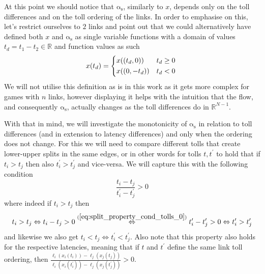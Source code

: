 \documentclass[10pt,a4paper]{book}
\newcommand{\LeftrightarrowArg}[1]{\stackrel{#1}{\Leftrightarrow}}
\newcommand{\as}{\mathrm{\alpha_s}}
\newcommand{\R}{\mathbb{R}}
\theoremstyle{definition}
\theoremstyle{comment}
\begin{document}
At this point we should notice that $\as$, similarly to $x$, depends only on the toll differences and on the toll ordering of the links.
In order to emphasise on this, let's restrict ourselves to $2$ links and point out that we could alternatively have defined both $x$ and $\as$ as single variable functions with a domain of values $t_d = t_1 - t_2 \in \R$ and function values as such
\[
	x(t_d) =
	\begin{cases*}
		x((t_d, 0)) & $t_d \ge 0$ \\
		x((0, -t_d)) & $t_d < 0$ \\
	\end{cases*}
\]
We will not utilise this definition as is in this work as it gets more complex for games with $n$ links, however displaying it helps with the intuition that the flow, and consequently $\as$, actually changes as the toll differences do in $\R^{N - 1}$.

With that in mind, we will investigate the monotonicity of $\as$ in relation to toll differences (and in extension to latency differences) and only when the ordering does not change.
For this we will need to compare different tolls that create lower-upper splits in the same edges, or in other words for tolls $t, t^\prime$ to hold that if $t_i > t_j$ then also $t_i^\prime > t_j^\prime$ and vice-versa.
We will capture this with the following condition
\begin{equation}
	\label{eq:split_property_cond_tolls_0}
	\frac{t_i - t_j}{t_i^\prime - t_j^\prime} > 0
\end{equation}
where indeed if $t_i > t_j$ then
\[t_i > t_j \Leftrightarrow t_i - t_j > 0 \LeftrightarrowArg{(\ref{eq:split_property_cond_tolls_0})} t_i^\prime - t_j^\prime > 0 \Leftrightarrow t_i^\prime > t_j^\prime\]
and likewise we also get $t_i < t_j \Leftrightarrow t_i^\prime < t_j^\prime$.
Also note that this property also holds for the respective latencies, meaning that if $t$ and $t^\prime$ define the same link toll ordering, then $\frac{\ell_i(x_i(t_i)) - \ell_j(x_j(t_j))}{\ell_i(x_i(t_i^\prime)) - \ell_j(x_j(t_j^\prime))} > 0$.
\end{document}
